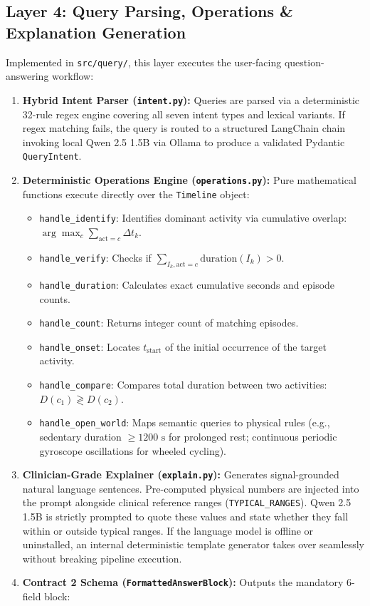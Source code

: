 \documentclass[11pt,a4paper]{article}
\begin{document}
\subsection{Layer 4: Query Parsing, Operations \& Explanation Generation}
Implemented in \texttt{src/query/}, this layer executes the user-facing question-answering workflow:
\begin{enumerate}[leftmargin=1.5em,noitemsep,topsep=2pt]
  \item \textbf{Hybrid Intent Parser (\texttt{intent.py}):} Queries are parsed via a deterministic 32-rule regex engine covering all seven intent types and lexical variants. If regex matching fails, the query is routed to a structured LangChain chain invoking local Qwen 2.5 1.5B via Ollama to produce a validated Pydantic \texttt{QueryIntent}.
  \item \textbf{Deterministic Operations Engine (\texttt{operations.py}):} Pure mathematical functions execute directly over the \texttt{Timeline} object:
  \begin{itemize}[noitemsep,topsep=1pt]
    \item \texttt{handle\_identify}: Identifies dominant activity via cumulative overlap: $\arg\max_c \sum_{\text{act}=c} \Delta t_k$.
    \item \texttt{handle\_verify}: Checks if $\sum_{I_k, \text{act}=c} \text{duration}(I_k) > 0$.
    \item \texttt{handle\_duration}: Calculates exact cumulative seconds and episode counts.
    \item \texttt{handle\_count}: Returns integer count of matching episodes.
    \item \texttt{handle\_onset}: Locates $t_{\text{start}}$ of the initial occurrence of the target activity.
    \item \texttt{handle\_compare}: Compares total duration between two activities: $D(c_1) \gtrless D(c_2)$.
    \item \texttt{handle\_open\_world}: Maps semantic queries to physical rules (e.g., sedentary duration $\ge 1200\text{ s}$ for prolonged rest; continuous periodic gyroscope oscillations for wheeled cycling).
  \end{itemize}
  \item \textbf{Clinician-Grade Explainer (\texttt{explain.py}):} Generates signal-grounded natural language sentences. Pre-computed physical numbers are injected into the prompt alongside clinical reference ranges (\texttt{TYPICAL\_RANGES}). Qwen 2.5 1.5B is strictly prompted to quote these values and state whether they fall within or outside typical ranges. If the language model is offline or uninstalled, an internal deterministic template generator takes over seamlessly without breaking pipeline execution.
  \item \textbf{Contract 2 Schema (\texttt{FormattedAnswerBlock}):} Outputs the mandatory 6-field block:
\end{enumerate}
\end{document}
